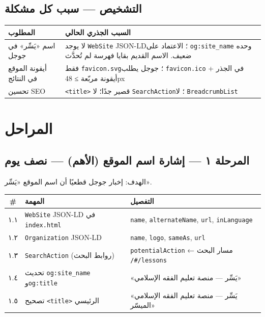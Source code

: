 \documentclass[11pt]{article}
\newcommand{\code}[1]{\textcolor{darkbg}{\texttt{\small #1}}}
\begin{document}
\subsection*{التشخيص — سبب كل مشكلة}
\begin{center}
\renewcommand{\arraystretch}{1.35}
\begin{tabular}{@{}p{4.5cm} p{9.5cm}@{}}
\toprule
\textbf{المطلوب} & \textbf{السبب الجذري الحالي} \\
\midrule
اسم «يَسِّر» في جوجل & لا يوجد \code{WebSite} JSON-LD؛ الاعتماد على \code{og:site\_name} وحده ضعيف. الاسم القديم بقايا فهرسة لم تُحدَّث \\
أيقونة الموقع في النتائج & فقط \code{favicon.svg}؛ جوجل يطلب \code{favicon.ico} في الجذر + أيقونة مربّعة ≥ 48px \\
تحسين SEO & \code{<title>} قصير جدًا؛ لا \code{SearchAction}؛ لا \code{BreadcrumbList} \\
\bottomrule
\end{tabular}
\end{center}

\section{المراحل}

\subsection{المرحلة ١ — إشارة اسم الموقع (الأهم) — نصف يوم}
الهدف: إخبار جوجل قطعيًا أن اسم الموقع «يَسِّر».

\begin{tabular}{@{}c p{6.5cm} p{5cm}@{}}
\toprule
\textbf{\#} & \textbf{المهمة} & \textbf{التفصيل} \\
\midrule
١.١ & \code{WebSite} JSON-LD في \code{index.html} & \code{name}, \code{alternateName}, \code{url}, \code{inLanguage} \\
١.٢ & \code{Organization} JSON-LD & \code{name}, \code{logo}, \code{sameAs}, \code{url} \\
١.٣ & \code{SearchAction} (روابط البحث) & \code{potentialAction} ← مسار البحث \code{/\#/lessons} \\
١.٤ & تحديث \code{og:site\_name} و\code{og:title} & «يَسِّر — منصة تعليم الفقه الإسلامي» \\
١.٥ & تصحيح \code{<title>} الرئيسي & «يَسِّر — منصة تعليم الفقه الإسلامي الميسّر» \\
\bottomrule
\end{tabular}
\end{document}
